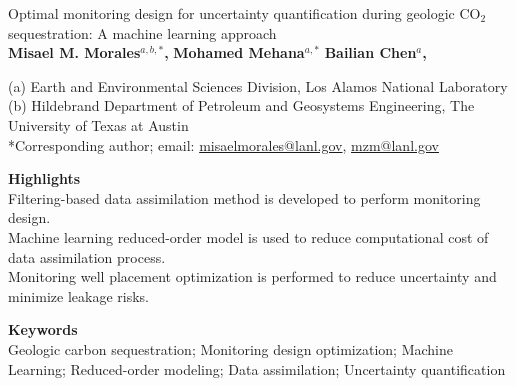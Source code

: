 \documentclass[10pt, twoside]{article}
\begin{document}
\doublespacing

\begin{center}
    {\huge Optimal monitoring design for uncertainty quantification during geologic CO$_2$ sequestration: A machine learning approach}
    \vspace{5mm}\\
    \textbf{Misael M. Morales$^{a,b,*}$,} \textbf{Mohamed Mehana$^{a,*}$} \textbf{Bailian Chen$^{a}$,}
\end{center}

\begin{flushleft}
(a) Earth and Environmental Sciences Division, Los Alamos National Laboratory \\
(b) Hildebrand Department of Petroleum and Geosystems Engineering, The University of Texas at Austin \\
*Corresponding author; email: \url{misaelmorales@lanl.gov}, \url{mzm@lanl.gov}
\end{flushleft}

\textbf{Highlights} \\
Filtering-based data assimilation method is developed to perform monitoring design.\\
Machine learning reduced-order model is used to reduce computational cost of data assimilation process.\\
Monitoring well placement optimization is performed to reduce uncertainty and minimize leakage risks.

\textbf{Keywords}\\
Geologic carbon sequestration; Monitoring design optimization; Machine Learning; Reduced-order modeling; Data assimilation; Uncertainty quantification

\end{document}
